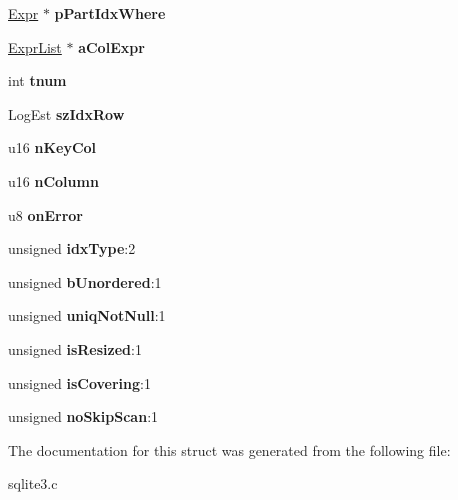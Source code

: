 \begin{DoxyCompactItemize}
\item 
\hyperlink{structExpr}{Expr} $\ast$ {\bfseries p\+Part\+Idx\+Where}\hypertarget{structIndex_a92dd15cc702e261dc2face5a27820e07}{}\label{structIndex_a92dd15cc702e261dc2face5a27820e07}

\item 
\hyperlink{structExprList}{Expr\+List} $\ast$ {\bfseries a\+Col\+Expr}\hypertarget{structIndex_ad56e9619762ce33f1a9cd96affc0d3d4}{}\label{structIndex_ad56e9619762ce33f1a9cd96affc0d3d4}

\item 
int {\bfseries tnum}\hypertarget{structIndex_af895a09c01701021c3e36362c04a1ae6}{}\label{structIndex_af895a09c01701021c3e36362c04a1ae6}

\item 
Log\+Est {\bfseries sz\+Idx\+Row}\hypertarget{structIndex_a9048746be17e02ffb3ac6d6a228e4a62}{}\label{structIndex_a9048746be17e02ffb3ac6d6a228e4a62}

\item 
u16 {\bfseries n\+Key\+Col}\hypertarget{structIndex_acfd52a6b0c7be163dcaf524574f69331}{}\label{structIndex_acfd52a6b0c7be163dcaf524574f69331}

\item 
u16 {\bfseries n\+Column}\hypertarget{structIndex_ab0e748636131297b5243e61ee9a8042c}{}\label{structIndex_ab0e748636131297b5243e61ee9a8042c}

\item 
u8 {\bfseries on\+Error}\hypertarget{structIndex_ae8bf87d0414e5c46b86192cfbdd271a7}{}\label{structIndex_ae8bf87d0414e5c46b86192cfbdd271a7}

\item 
unsigned {\bfseries idx\+Type}\+:2\hypertarget{structIndex_aebd62422c514bd90aab41606bec71032}{}\label{structIndex_aebd62422c514bd90aab41606bec71032}

\item 
unsigned {\bfseries b\+Unordered}\+:1\hypertarget{structIndex_ae96b00c29b348bce9d58a5073fdb6d3e}{}\label{structIndex_ae96b00c29b348bce9d58a5073fdb6d3e}

\item 
unsigned {\bfseries uniq\+Not\+Null}\+:1\hypertarget{structIndex_a541590f6cf6c45705b3ef19fdce091ca}{}\label{structIndex_a541590f6cf6c45705b3ef19fdce091ca}

\item 
unsigned {\bfseries is\+Resized}\+:1\hypertarget{structIndex_ad9c4a83513b3cf885782dcd459ed061f}{}\label{structIndex_ad9c4a83513b3cf885782dcd459ed061f}

\item 
unsigned {\bfseries is\+Covering}\+:1\hypertarget{structIndex_ac4151fa2557d26d7c538f25a03d0b44e}{}\label{structIndex_ac4151fa2557d26d7c538f25a03d0b44e}

\item 
unsigned {\bfseries no\+Skip\+Scan}\+:1\hypertarget{structIndex_a7704321883c8b38e6dcca88b5886d4ee}{}\label{structIndex_a7704321883c8b38e6dcca88b5886d4ee}

\end{DoxyCompactItemize}


The documentation for this struct was generated from the following file\+:\begin{DoxyCompactItemize}
\item 
sqlite3.\+c\end{DoxyCompactItemize}
